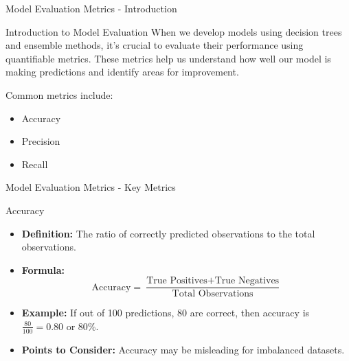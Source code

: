 \documentclass[aspectratio=169]{beamer}
\begin{document}
\begin{frame}[fragile]{Model Evaluation Metrics - Introduction}
    \begin{block}{Introduction to Model Evaluation}
        When we develop models using decision trees and ensemble methods, it's crucial to evaluate their performance using quantifiable metrics. These metrics help us understand how well our model is making predictions and identify areas for improvement.
    \end{block}
    
    Common metrics include:
    \begin{itemize}
        \item Accuracy
        \item Precision
        \item Recall
    \end{itemize}
\end{frame}

\begin{frame}[fragile]{Model Evaluation Metrics - Key Metrics}
    \begin{block}{Accuracy}
        \begin{itemize}
            \item \textbf{Definition:} The ratio of correctly predicted observations to the total observations.
            \item \textbf{Formula:}
            \begin{equation}
                \text{Accuracy} = \frac{\text{True Positives} + \text{True Negatives}}{\text{Total Observations}}
            \end{equation}
            \item \textbf{Example:} If out of 100 predictions, 80 are correct, then accuracy is \( \frac{80}{100} = 0.80 \) or 80\%.
            \item \textbf{Points to Consider:} Accuracy may be misleading for imbalanced datasets.
        \end{itemize}
    \end{block}
\end{frame}
\end{document}
